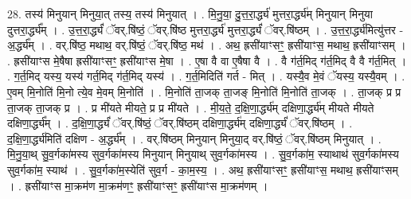 \documentclass[17pt]{extarticle}
\begin{document}
28. तस्य॑ मिनुयान् मिनुया॒त् तस्य॒ तस्य॑ मिनुयात् । . मि॒नु॒या॒ दु॒त्त॒रा॒र्द्ध्य॑ मुत्तरा॒र्द्ध्य॑म् मिनुयान् मिनुया दुत्तरा॒र्द्ध्य᳚म् । . उ॒त्त॒रा॒र्द्ध्यं॑ ॅवर्.षि॑ष्ठं॒ ॅवर्.षि॑ष्ठ मुत्तरा॒र्द्ध्य॑ मुत्तरा॒र्द्ध्यं॑ ॅवर्.षि॑ष्ठम् । . उ॒त्त॒रा॒र्द्ध्य॑मित्यु॑त्तर - अ॒र्द्ध्य᳚म् । . वर्.षि॑ष्ठ॒ मथाथ॒ वर्.षि॑ष्ठं॒ ॅवर्.षि॑ष्ठ॒ मथ॑ । . अथ॒ ह्रसी॑याꣳसꣳ॒॒ ह्रसी॑याꣳस॒ मथाथ॒ ह्रसी॑याꣳसम् । . ह्रसी॑याꣳस मे॒षैषा ह्रसी॑याꣳसꣳ॒॒ ह्रसी॑याꣳस मे॒षा । . ए॒षा वै वा ए॒षैषा वै । . वै ग॑र्त॒मिद् ग॑र्त॒मिद् वै वै ग॑र्त॒मित् । . ग॒र्त॒मिद् यस्य॒ यस्य॑ गर्त॒मिद् ग॑र्त॒मिद् यस्य॑ । . ग॒र्त॒मिदिति॑ गर्त - मित् । . यस्यै॒व मे॒वं ॅयस्य॒ यस्यै॒वम् । . ए॒वम् मि॒नोति॑ मि॒नो त्ये॒व मे॒वम् मि॒नोति॑ । . मि॒नोति॑ ता॒जक् ता॒जङ् मि॒नोति॑ मि॒नोति॑ ता॒जक् । . ता॒जक् प्र प्र ता॒जक् ता॒जक् प्र । . प्र मी॑यते मीयते॒ प्र प्र मी॑यते । . मी॒य॒ते॒ द॒क्षि॒णा॒र्द्ध्य॑म् दक्षिणा॒र्द्ध्य॑म् मीयते मीयते दक्षिणा॒र्द्ध्य᳚म् । . द॒क्षि॒णा॒र्द्ध्यं॑ ॅवर्.षि॑ष्ठं॒ ॅवर्.षि॑ष्ठम् दक्षिणा॒र्द्ध्य॑म् दक्षिणा॒र्द्ध्यं॑ ॅवर्.षि॑ष्ठम् । . द॒क्षि॒णा॒र्द्ध्य॑मिति॑ दक्षिण - अ॒र्द्ध्य᳚म् । . वर्.षि॑ष्ठम् मिनुयान् मिनुया॒द् वर्.षि॑ष्ठं॒ ॅवर्.षि॑ष्ठम् मिनुयात् । . मि॒नु॒या॒थ् सु॒व॒र्गका॑मस्य सुव॒र्गका॑मस्य मिनुयान् मिनुयाथ् सुव॒र्गका॑मस्य । . सु॒व॒र्गका॑म॒ स्याथाथ॑ सुव॒र्गका॑मस्य सुव॒र्गका॑म॒ स्याथ॑ । . सु॒व॒र्गका॑म॒स्येति॑ सुव॒र्ग - का॒म॒स्य॒ । . अथ॒ ह्रसी॑याꣳसꣳ॒॒ ह्रसी॑याꣳस॒ मथाथ॒ ह्रसी॑याꣳसम् । . ह्रसी॑याꣳस मा॒क्रम॑ण मा॒क्रम॑णꣳ॒॒ ह्रसी॑याꣳसꣳ॒॒ ह्रसी॑याꣳस मा॒क्रम॑णम् । \newline
\end{document}
